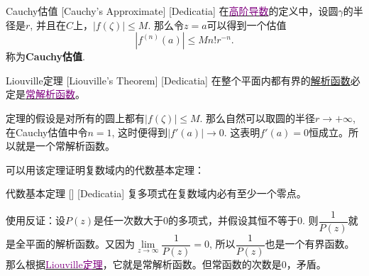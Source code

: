 \documentclass[UTF8]{ctexart}
\newcommand{\hyperrefc}[2]{\hyperref[#1]{\textcolor{purple}{#2}}}
\newcommand{\AnalyticalFunction}{\hyperref[dfn:AnalyticalFunction]{解析函数}}
\begin{document}
\begin{dfn}
    [UUID]
    {Cauchy估值}
    [Cauchy's Approximate]
    [Dedicatia]
    在\hyperrefc{dfn:HighOrderedDerivative}{高阶导数}的定义中，设圆$\gamma$的半径是$r$, 并且在$C$上，$|f(\zeta)|\leqslant M$. 那么令$z=a$可以得到一个估值
    \[|f^{(n)}(a)|\leqslant Mn!r^{-n}.\]
    称为\textbf{Cauchy估值}.
\end{dfn}
\begin{thm}
    [Liouville]
    {Liouville定理}
    [Liouville's Theorem]
    [Dedicatia]
    在整个平面内都有界的\AnalyticalFunction 必定是\hyperrefc{ppt:TrivialAnalyticalFunction}{常解析函数}。
\end{thm}
\begin{prf}
    定理的假设是对所有的圆上都有$|f(\zeta)|\leqslant M$. 那么自然可以取圆的半径$r\to+\infty $, 在Cauchy估值中令$n=1$, 这时便得到$|f'(a)|\to 0$. 这表明$f'(a)=0$恒成立。所以就是一个常解析函数。
\end{prf}
可以用该定理证明复数域内的代数基本定理：
\begin{thm}
    [UUID]
    {代数基本定理}
    []
    [Dedicatia]
    复多项式在复数域内必有至少一个零点。
\end{thm}
\begin{prf}
    使用反证：设$P(z)$是任一次数大于0的多项式，并假设其恒不等于0. 则$\dfrac{1}{P(z)}$就是全平面的解析函数。又因为$\lim\limits_{z\to\infty}\dfrac{1}{P(z)}=0$, 所以$\dfrac{1}{P(z)}$也是一个有界函数。那么根据\hyperrefc{thm:Liouville}{Liouville定理}，它就是常解析函数。但常函数的次数是0，矛盾。
\end{prf}
\end{document}
